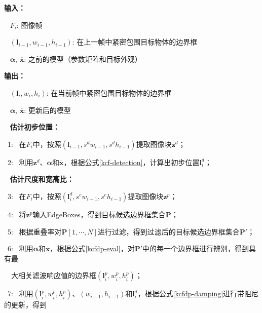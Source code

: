 \begin{algorithm}[htb]
	\begin{flushleft}
		{{}\textbf{输入：}}{\small \par}
		{\quad{}}{{\ } $F_i$: 图像帧}{\small \par}
		{\quad{}}{{\ } $(\mathbf{l}_{i-1}, w_{i-1}, h_{i-1})$: 在上一帧中紧密包围目标物体的边界框}{\small \par}
		{\quad{}}{{\ } $\boldsymbol{\alpha}$, $\overline{\mathbf{x}}$: 之前的模型（参数矩阵和目标外观）}{\small \par}
		\vspace{0.1in}
		{{}\textbf{输出：}}{\small \par}
		{\quad{}}{{\ } $(\mathbf{l}_{i}, w_{i}, h_{i})$: 在当前帧中紧密包围目标物体的边界框}{\small \par}
		{\quad{}}{{\ } $\boldsymbol{\alpha}$, $\overline{\mathbf{x}}$: 更新后的模型}{\small \par}
		\vspace{0.1in}
		{\quad{}\ }{{} \textbf{估计初步位置：}}{\small \par}
		{{} \ 1: \ 在$F_i$中，按照$(\mathbf{l}_{i-1}, s^dw_{i-1}, s^dh_{i-1})$提取图像块$\mathbf{z}^d$；}{\small \par}
		{{} \ 2: \ 利用$\mathbf{z}^d$、$\boldsymbol{\alpha}$和$\overline{\mathbf{x}}$，根据公式\ref{kcf-detection}，计算出初步位置$\mathbf{l}^d_{i}$；}{\small \par}
		\vspace{0.1in}
		{\quad{}\ }{{} \textbf{估计尺度和宽高比：}}{\small \par}
		{{} \ 3: \ 在$F_i$中，按照$(\mathbf{l}^d_{i}, s^ew_{i-1}, s^eh_{i-1})$提取图像块$\mathbf{z}^p$；}{\small \par}
		{{} \ 4: \ 将$\mathbf{z}^p$输入EdgeBoxes，得到目标候选边界框集合$\mathbf{P}$；}{\small \par}
		{{} \ 5: \ 根据重叠率对$\mathbf{P}[1,\cdots,N]$进行过滤，得到过滤后的目标候选边界框集合$\mathbf{P}'$；}{\small \par}
		{{} \ 6: \ 利用$\boldsymbol{\alpha}$和$\overline{\mathbf{x}}$，根据公式\ref{kcfdp-eval}，对$\mathbf{P}'$中的每一个边界框进行辨别，得到具有最}{\small \par}
		{\quad{}\ \ }{大相关滤波响应值的边界框$(\mathbf{l}^p_{i}, w^p_{i}, h^p_{i})$；}{\small \par}
		{{} \ 7: \ 利用$(\mathbf{l}^p_{i}, w^p_{i}, h^p_{i})$、$(w_{i-1}, h_{i-1})$和$\mathbf{l}^d_{i}$，根据公式\ref{kcfdp-damping}进行带阻尼的更新，得到}{\small \par}

\end{flushleft}
\end{algorithm}
